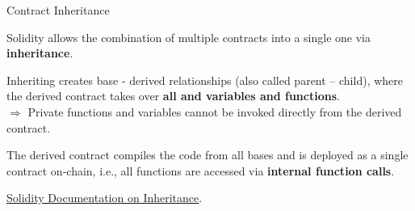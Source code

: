 \documentclass[handout]{beamer}
\begin{document}
\begin{frame}{Contract Inheritance}

\vspace{0.5em}

\begin{minipage}{0.35\textwidth}
	\begin{figure}[t]
		\centering
		\begin{tikzpicture}[scale=0.9, every node/.style={scale=0.9}]
			
		\end{tikzpicture}
	\end{figure}
\end{minipage}
\begin{minipage}{0.63\textwidth}
	Solidity allows the combination of multiple contracts into a single one via \textbf{inheritance}.

	\vspace{0.5em}

	Inheriting creates base - derived relationships (also called parent – child), where the derived contract takes over \textbf{all  and  variables and functions}.\\
	\vspace{0.5em}
$\Rightarrow$ Private functions and variables cannot be invoked directly from the derived contract.

\end{minipage}

\vspace{1em}

	The derived contract compiles the code from all bases and is deployed as a single contract on-chain, i.e.,  all functions are accessed via \textbf{internal function calls}. 

\vspace{1.5em}

\link \href{https://docs.soliditylang.org/en/latest/contracts.html\#inheritance}{Solidity Documentation on Inheritance}.

\end{frame}
\end{document}
